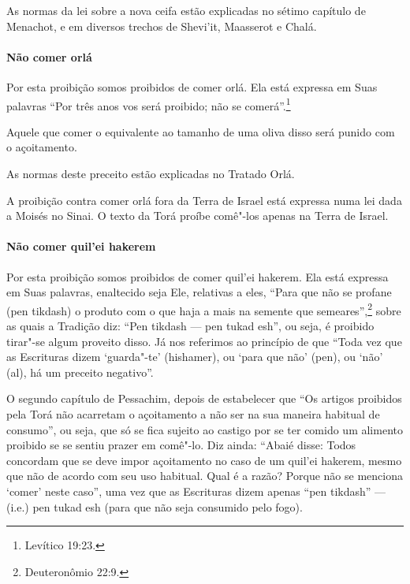 \begin{multicols}{2}
As normas da lei sobre a nova ceifa estão explicadas no sétimo capítulo
de Menachot\starr, e em diversos trechos de Shevi'it\starr, Maasserot\starr{} e Chalá\starr.

\paragraph{Não comer orlá\starr}

Por esta proibição somos proibidos de comer orlá\starr. Ela está expressa
em Suas palavras ``Por três anos vos será proibido; não se comerá''.\footnote{Levítico 19:23.}

Aquele que comer o equivalente ao tamanho de uma oliva disso será punido
com o açoitamento.

As normas deste preceito estão explicadas no Tratado Orlá\starr.

A proibição contra comer orlá\starr{} fora da Terra de Israel está expressa
numa lei dada a Moisés no Sinai. O texto da Torá\starr{} proíbe comê"-los apenas
na Terra de Israel.

\paragraph{Não comer quil'ei hakerem\starr}

Por esta proibição somos proibidos de comer quil'ei hakerem\starr. Ela
está expressa em Suas palavras, enaltecido seja Ele, relativas a eles,
``Para que não se profane (pen tikdash\starr) o produto com o que haja a mais
na semente que semeares'',\footnote{Deuteronômio 22:9.} sobre as quais a Tradição
diz: ``Pen tikdash --- pen tukad esh\starr'', ou seja, é proibido tirar"-se algum proveito disso. Já nos
referimos ao princípio de que ``Toda vez que as Escrituras dizem
`guarda"-te' (hishamer\starr), ou `para que não' (pen), ou `não' (al), há um
preceito negativo''.

O segundo capítulo de Pessachim\starr, depois de estabelecer que ``Os artigos
proibidos pela Torá\starr{} não acarretam o açoitamento a não ser na sua
maneira habitual de consumo'', ou seja, que só se fica sujeito ao
castigo por se ter comido um alimento proibido se se sentiu prazer em
comê"-lo. Diz ainda: ``Abaié\starr{} disse: Todos concordam que se deve impor
açoitamento no caso de um quil'ei hakerem\starr, mesmo que não de acordo
com seu uso habitual. Qual é a razão? Porque não se menciona `comer'
neste caso'', uma vez que as Escrituras dizem apenas ``pen tikdash\starr''
--- (i.e.) pen tukad esh\starr{} (para que não seja consumido pelo fogo).


\end{multicols}
